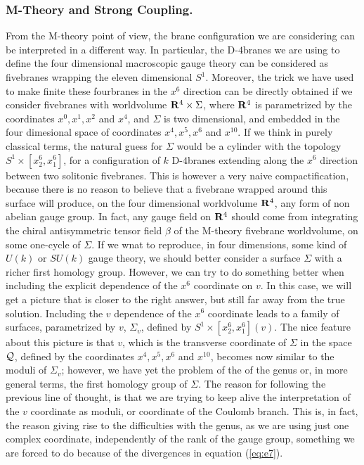   
\subsubsection{M-Theory and Strong Coupling.}

From the M-theory point of view, the brane configuration we are
considering can be interpreted in a different way. In particular,
the D-$4$branes we are using to define the four dimensional
macroscopic gauge theory can be considered as fivebranes wrapping
the eleven dimensional $S^1$. Moreover, the trick we have used to
make finite these fourbranes in the $x^6$ direction can be
directly obtained if we consider fivebranes with worldvolume
${\bf R}^4 \times \Sigma$, where ${\bf R}^4$ is parametrized by
the coordinates $x^0,x^1,x^2$ and $x^4$, and $\Sigma$ is two
dimensional, and embedded in the four dimesional space of
coordinates $x^4,x^5,x^6$ and $x^{10}$. If we think in purely
classical terms, the natural guess for $\Sigma$ would be a
cylinder with the topology $S^1 \times [x^6_2,x^6_1]$, for a
configuration of $k$ D-$4$branes extending along the $x^6$
direction between two solitonic fivebranes. This is however a
very naive compactification, because there is no reason to
believe that a fivebrane wrapped around this surface will
produce, on the four dimensional worldvolume ${\bf R}^4$, any
form of non abelian gauge group. In fact, any gauge field on
${\bf R}^4$ should come from integrating the chiral antisymmetric
tensor field $\beta$ of the M-theory fivebrane worldvolume, on
some one-cycle of $\Sigma$. If we wnat to reproduce, in four
dimensions, some kind of $U(k)$ or $SU(k)$ gauge theory, we
should better consider a surface $\Sigma$ with a richer first
homology group. However, we can try to do something better when
including the explicit dependence of the $x^6$ coordinate on $v$.
In this case, we will get a picture that is closer to the right
answer, but still far away from the true solution. Including the
$v$ dependence of the $x^6$ coordinate leads to a family of
surfaces, parametrized by $v$, $\Sigma_v$, defined by $S^1 \times
[x^6_2,x^6_1](v)$. The nice feature about this picture is that
$v$, which is the transverse coordinate of $\Sigma$ in the space
${\cal Q}$, defined by the coordinates $x^4,x^5,x^6$ and
$x^{10}$, becomes now similar to the moduli of $\Sigma_v$;
however, we have yet the problem of the of the genus or, in more
general terms, the first homology group of $\Sigma$. The reason
for following the previous line of thought, is that we are trying
to keep alive the interpretation of the $v$ coordinate as moduli,
or coordinate of the Coulomb branch. This is, in fact, the reason
giving rise to the difficulties with the genus, as we are using
just one complex coordinate, independently of the rank of the
gauge group, something we are forced to do because of the
divergences in equation (\ref{eq:e7}).
  
